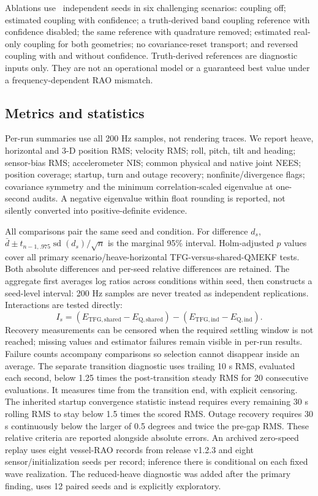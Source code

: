 \documentclass[conference]{IEEEtran}
\begin{document}
Ablations use \AblationSeeds\ independent seeds in six challenging scenarios:
coupling off; estimated coupling with confidence; a truth-derived band coupling
reference with confidence disabled; the same reference with quadrature removed;
estimated real-only coupling for both geometries; no covariance-reset transport;
and reversed coupling with and without confidence. Truth-derived references are
diagnostic inputs only. They are not an operational model or a guaranteed best
value under a frequency-dependent RAO mismatch.

\subsection{Metrics and statistics}
Per-run summaries use all 200 Hz samples, not rendering traces. We report heave,
horizontal and 3-D position RMS; velocity RMS; roll, pitch, tilt and heading;
sensor-bias RMS; accelerometer NIS; common physical and native joint NEES;
position coverage; startup, turn and outage recovery; nonfinite/divergence
flags; covariance symmetry and the minimum correlation-scaled eigenvalue at
one-second audits. A negative eigenvalue within float rounding is reported,
not silently converted into positive-definite evidence.

All comparisons pair the same seed and condition. For difference $d_s$,
$\bar d\pm t_{n-1,.975}\operatorname{sd}(d_s)/\sqrt n$ is the marginal 95\%
interval. Holm-adjusted $p$ values cover all primary scenario/heave-horizontal
TFG-versus-shared-QMEKF tests. Both absolute differences and per-seed relative
differences are retained. The aggregate first averages log ratios across
conditions within seed, then constructs a seed-level interval: 200 Hz samples
are never treated as independent replications. Interactions are tested directly:
\begin{equation}
 I_s=(E_{\mathrm{TFG,shared}}-E_{\mathrm{Q,shared}})
      -(E_{\mathrm{TFG,ind}}-E_{\mathrm{Q,ind}}).
\end{equation}
Recovery measurements can be censored when the required settling window is
not reached; missing values and estimator failures remain visible in per-run
results. Failure counts accompany comparisons so selection cannot disappear
inside an average.
The separate transition diagnostic uses trailing 10 s RMS, evaluated each
second, below 1.25 times the post-transition steady RMS for 20 consecutive
evaluations. It measures time from the transition end, with explicit censoring.
The inherited startup convergence statistic instead requires every remaining
30 s rolling RMS to stay below 1.5 times the scored RMS. Outage recovery requires
30 s continuously below the larger of 0.5 degrees and twice the pre-gap RMS.
These relative criteria are reported alongside absolute errors.
An archived zero-speed replay uses eight vessel-RAO records from release v1.2.3
and eight sensor/initialization seeds per record; inference there is conditional
on each fixed wave realization. The reduced-heave diagnostic was added after
the primary finding, uses 12 paired seeds and is explicitly exploratory.
\end{document}
